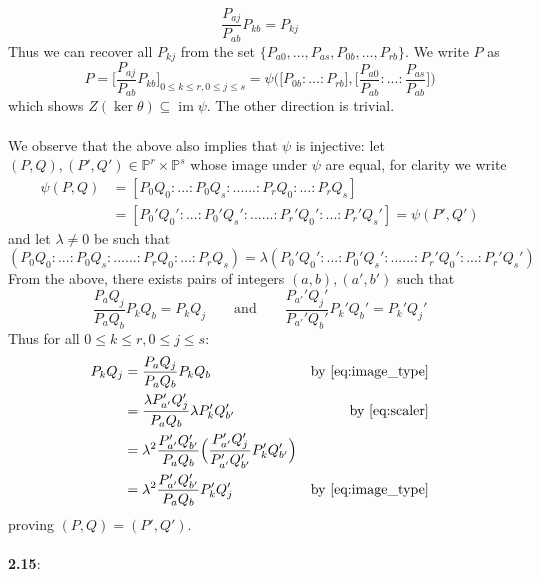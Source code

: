 \documentclass[12pt]{article}
\numberwithin{thm}{subsection}
\numberwithin{defn}{subsection}
\numberwithin{lemma}{subsection}
\numberwithin{example}{subsection}
\numberwithin{notation}{subsection}
\numberwithin{cor}{subsection}
\numberwithin{remark}{subsection}
\numberwithin{condition}{subsection}
\numberwithin{question}{subsection}
\numberwithin{construction}{subsection}
\numberwithin{construction}{subsection}
\numberwithin{construction}{subsection}
\newcommand{\bb}[1]{\mathbb{#1}}
\newcommand{\im}{\operatorname{im}}
\begin{document}
\[\frac{P_{aj}}{P_{ab}}P_{kb} = P_{kj}\]
Thus we can recover all $P_{kj}$ from the set $\lbrace P_{a0},...,P_{as},P_{0b},...,P_{rb}\rbrace$. We write $P$ as
\[P = \Big[\frac{P_{aj}}{P_{ab}}P_{kb}\Big]_{0 \leq k \leq r, 0 \leq j \leq s} = \psi\Big(\big[P_{0b}:...:P_{rb}\big], \big[\frac{P_{a0}}{P_{ab}}:...:\frac{P_{as}}{P_{ab}}\big]\Big)\]
which shows $Z(\ker \theta) \subseteq \im \psi$. The other direction is trivial.\\\\

We observe that the above also implies that $\psi$ is injective: let $(P,Q),(P',Q') \in \bb{P}^r \times \bb{P}^s$ whose image under $\psi$ are equal, for clarity we write
\begin{align*}
    \psi(P,Q) &= [P_0Q_0:...:P_0Q_s:......:P_rQ_0:...:P_rQ_s]\\
    &= [P_0'Q_0':...:P_0'Q_s':......:P_r'Q_0':...:P_r'Q_s'] = \psi(P',Q')
\end{align*}
and let $\lambda \neq 0$ be such that 
\begin{equation}\label{eq:scaler}
(P_0Q_0:...:P_0Q_s:......:P_rQ_0:...:P_rQ_s) = \lambda (P_0'Q_0':...:P_0'Q_s':......:P_r'Q_0':...:P_r'Q_s')
\end{equation}
From the above, there exists pairs of integers $(a,b),(a',b')$ such that
\begin{equation}\label{eq:image_type}
    \frac{P_{a}Q_j}{P_{a}Q_b}P_kQ_b = P_kQ_j\qquad\text{and}\qquad \frac{P_{a'}'Q_j'}{P_{a'}'Q_b'}P_k'Q_b' = P_k'Q_j'
\end{equation}
Thus for all $0 \leq k \leq r, 0 \leq j \leq s$:
\begin{align*}
    P_kQ_j &= \frac{P_{a}Q_j}{P_{a}Q_b}P_kQ_b & \text{by }\eqref{eq:image_type}\\
    &= \frac{\lambda P'_{a'}Q'_j}{P_{a}Q_b}\lambda P'_kQ_{b'}' & \text{by }\eqref{eq:scaler}\\
    &= \lambda^2 \frac{P_{a'}'Q_{b'}'}{P_{a}Q_{b}} \Big(\frac{P_{a'}'Q_j'}{P_{a'}'Q_{b'}'}P_k'Q_{b'}'\Big)\\
    &= \lambda^2 \frac{P_{a'}'Q_{b'}'}{P_{a}Q_{b}} P_k'Q_j' & \text{by }\eqref{eq:image_type}
\end{align*}
proving $(P,Q) = (P',Q')$.\\\\
%
\textbf{2.15}:\\
\end{document}
